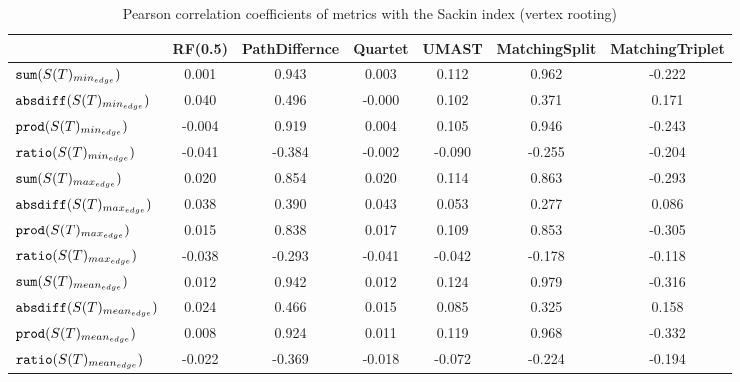\begin{table}[h]
\centering
\caption{Pearson correlation coefficients of metrics with the Sackin index (vertex rooting)}
\begin{tabular}{lcccccc}
 & RF(0.5) & PathDiffernce & Quartet & UMAST & MatchingSplit & MatchingTriplet \\
\hline
${\verb+sum+}(S(T)_{min_{edge}})$ & 0.001 & 0.943 & 0.003 & 0.112 & 0.962 & -0.222 \\
${\verb+absdiff+}(S(T)_{min_{edge}})$ & 0.040 & 0.496 & -0.000 & 0.102 & 0.371 & 0.171 \\
${\verb+prod+}(S(T)_{min_{edge}})$ & -0.004 & 0.919 & 0.004 & 0.105 & 0.946 & -0.243 \\
${\verb+ratio+}(S(T)_{min_{edge}})$ & -0.041 & -0.384 & -0.002 & -0.090 & -0.255 & -0.204 \\
${\verb+sum+}(S(T)_{max_{edge}})$ & 0.020 & 0.854 & 0.020 & 0.114 & 0.863 & -0.293 \\
${\verb+absdiff+}(S(T)_{max_{edge}})$ & 0.038 & 0.390 & 0.043 & 0.053 & 0.277 & 0.086 \\
${\verb+prod+}(S(T)_{max_{edge}})$ & 0.015 & 0.838 & 0.017 & 0.109 & 0.853 & -0.305 \\
${\verb+ratio+}(S(T)_{max_{edge}})$ & -0.038 & -0.293 & -0.041 & -0.042 & -0.178 & -0.118 \\
${\verb+sum+}(S(T)_{mean_{edge}})$ & 0.012 & 0.942 & 0.012 & 0.124 & 0.979 & -0.316 \\
${\verb+absdiff+}(S(T)_{mean_{edge}})$ & 0.024 & 0.466 & 0.015 & 0.085 & 0.325 & 0.158 \\
${\verb+prod+}(S(T)_{mean_{edge}})$ & 0.008 & 0.924 & 0.011 & 0.119 & 0.968 & -0.332 \\
${\verb+ratio+}(S(T)_{mean_{edge}})$ & -0.022 & -0.369 & -0.018 & -0.072 & -0.224 & -0.194 \\
\end{tabular}
\end{table}

